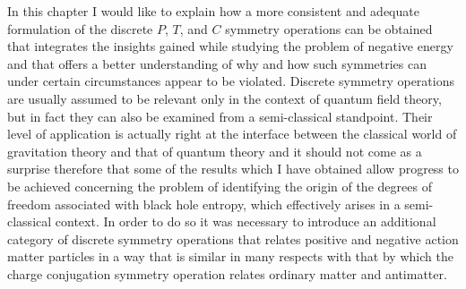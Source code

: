 \documentclass[notitlepage,12pt]{report}
\begin{document}
In this chapter I would like to explain how a more consistent and adequate formulation of the discrete $P$, $T$, and $C$ symmetry operations can be obtained that integrates the insights gained while studying the problem of negative energy and that offers a better understanding of why and how such symmetries can under certain circumstances appear to be violated. Discrete symmetry operations are usually assumed to be relevant only in the context of quantum field theory, but in fact they can also be examined from a semi-classical standpoint. Their level of application is actually right at the interface between the classical world of gravitation theory and that of quantum theory and it should not come as a surprise therefore that some of the results which I have obtained allow progress to be achieved concerning the problem of identifying the origin of the degrees of freedom associated with black hole entropy, which effectively arises in a semi-classical context. In order to do so it was necessary to introduce an additional category of discrete symmetry operations that relates positive and negative action matter particles in a way that is similar in many respects with that by which the charge conjugation symmetry operation relates ordinary matter and antimatter.
\end{document}
